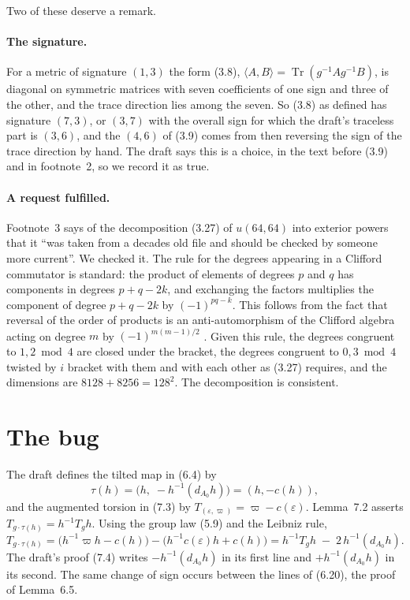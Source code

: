 \documentclass[11pt]{article}
\theoremstyle{remark}
\newcommand{\vp}{\varpi}
\newcommand{\eps}{\varepsilon}
\newcommand{\dA}{d_{A_0}}
\begin{document}
Two of these deserve a remark.

\paragraph{The signature.} For a metric of signature $(1,3)$ the form (3.8),
$\langle A,B\rangle=\operatorname{Tr}(g^{-1}Ag^{-1}B)$, is diagonal on symmetric matrices with
seven coefficients of one sign and three of the other, and the trace direction lies among the
seven. So (3.8) as defined has signature $(7,3)$, or $(3,7)$ with the overall sign for which
the draft's traceless part is $(3,6)$, and the $(4,6)$ of (3.9) comes from then reversing the
sign of the trace direction by hand. The draft says this is a choice, in the text before (3.9)
and in footnote~2, so we record it as true.

\paragraph{A request fulfilled.} Footnote~3 says of the decomposition (3.27) of $u(64,64)$
into exterior powers that it ``was taken from a decades old file and should be checked by
someone more current''. We checked it. The rule for the degrees appearing in a Clifford
commutator is standard: the product of elements of degrees $p$ and $q$ has components in
degrees $p+q-2k$, and exchanging the factors multiplies the component of degree $p+q-2k$ by
$(-1)^{pq-k}$. This follows from the fact that reversal of the order of products is an
anti-automorphism of the Clifford algebra acting on degree $m$ by $(-1)^{m(m-1)/2}$
\cite[Chapter~I, Section~1]{LM}. Given this rule, the degrees congruent to $1,2 \bmod 4$ are closed under the bracket, the
degrees congruent to $0,3\bmod 4$ twisted by $i$ bracket with them and with each other as
(3.27) requires, and the dimensions are $8128+8256=128^2$. The decomposition is consistent.

\section{The bug}

The draft defines the tilted map in (6.4) by
\[
\tau(h) = \bigl(h,\; -h^{-1}(\dA h)\bigr) = (h, -c(h)),
\]
and the augmented torsion in (7.3) by $T_{(\eps,\vp)}=\vp-c(\eps)$. Lemma~7.2 asserts
$T_{g\cdot\tau(h)}=h^{-1}T_g h$. Using the group law (5.9) and the Leibniz rule,
\[
T_{g\cdot\tau(h)}
= \bigl(h^{-1}\vp h - c(h)\bigr) - \bigl(h^{-1}c(\eps)h + c(h)\bigr)
= h^{-1}T_g h \;-\; 2\,h^{-1}(\dA h).
\]
The draft's proof (7.4) writes $-h^{-1}(\dA h)$ in its first line and $+h^{-1}(\dA h)$ in its
second. The same change of sign occurs between the lines of (6.20), the proof of Lemma~6.5.
\end{document}
